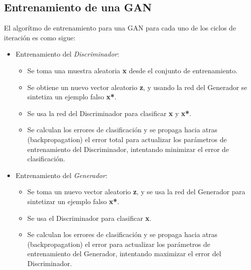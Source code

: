 \subsection{Entrenamiento de una GAN}
El algorítmo de entrenamiento para una GAN \cite{langrGANsActionDeep2019} para cada uno de los
ciclos de iteración es como sigue:
\begin{itemize}
    \item Entrenamiento del \emph{Discriminador}:
    \begin{itemize}
        \item Se toma una muestra aleatoria \textbf{x} desde el conjunto de entrenamiento.
        \item Se obtiene un nuevo vector aleatorio \textbf{z}, y usando la red del Generador se sintetiza
                un ejemplo falso \textbf{x*}.
        \item Se usa la red del Discriminador para clasificar \textbf{x} y \textbf{x*}.
        \item Se calculan los errores de clasificación y se propaga hacia atras (backpropagation) el error total
            para actualizar los parámetros de entrenamiento del Discriminador, intentando minimizar el error de clasificación.
    \end{itemize}

    \item Entrenamiento del \emph{Generador}:
    \begin{itemize}
        \item Se toma un nuevo vector aleatorio \textbf{z}, y se usa la red del Generador para sintetizar
        un ejemplo falso \textbf{x*}.
        \item Se usa el Discriminador para clasificar \textbf{x}.
        \item Se calculan los errores de clasificación y se propaga hacia atras (backpropagation) el error
        para actualizar los parámetros de entrenamiento del Generador, intentando maximizar el error del Discriminador.
    \end{itemize}
\end{itemize}

